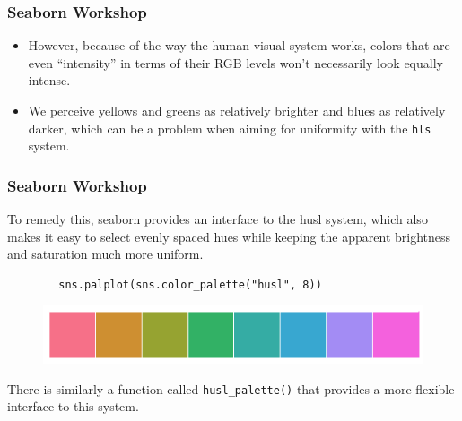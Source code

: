 \documentclass{beamer}
\begin{document}
\begin{frame}[fragile]
\frametitle{Seaborn Workshop}
\large
\begin{itemize}
\item However, because of the way the human visual system works, colors that are even “intensity” in terms of their RGB levels won’t necessarily look equally intense.
\item  We perceive yellows and greens as relatively brighter and blues as relatively darker, which can be a problem when aiming for uniformity with the \texttt{hls} system.
\end{itemize}

\end{frame}
	\begin{frame}[fragile]
		\frametitle{Seaborn Workshop}
		\large
		
		To remedy this, seaborn provides an interface to the husl system, which also makes it easy to select evenly spaced hues while keeping the apparent brightness and saturation much more uniform.
		\begin{verbatim}
		sns.palplot(sns.color_palette("husl", 8))
		\end{verbatim}
		
		\begin{figure}
			\centering
			\includegraphics[width=0.7\linewidth]{images/color_palettes_14_0}
		\end{figure}
		
		There is similarly a function called \texttt{husl\_palette()} that provides a more flexible interface to this system.
	\end{frame}
\end{document}
